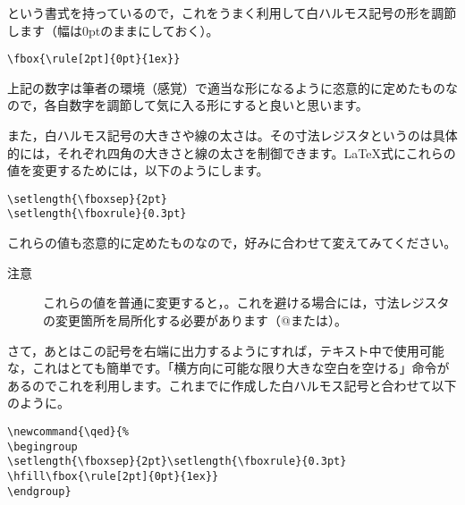 \documentclass[autodetect-engine,dvipdfmx]{jsarticle}
\begin{document}
という書式を持っているので，これをうまく利用して白ハルモス記号の形を調節します（幅は0ptのままにしておく）。

\begin{tcolorbox}

\begin{verbatim}
\fbox{\rule[2pt]{0pt}{1ex}}
\end{verbatim}

\end{tcolorbox}

上記の数字は筆者の環境（感覚）で適当な形になるように恣意的に定めたものなので，各自数字を調節して気に入る形にすると良いと思います。

また，白ハルモス記号の大きさや線の太さは\verb@{}。その寸法レジスタというのは具体的には\verb@{}\verb@{}，それぞれ四角の大きさと線の太さを制御できます。\LaTeX 式にこれらの値を変更するためには，以下のようにします。

\begin{tcolorbox}

\begin{verbatim}
\setlength{\fboxsep}{2pt}
\setlength{\fboxrule}{0.3pt}
\end{verbatim}

\end{tcolorbox}

これらの値も恣意的に定めたものなので，好みに合わせて変えてみてください。

\begin{description}
\item[注意]これらの値を普通に変更すると，\verb@{}\verb@{}。これを避ける場合には，寸法レジスタの変更箇所を局所化する必要があります（\verb@{}\verb@{}@または\verb@\begingroup{}）。
\end{description}

さて，あとはこの記号を右端に出力するようにすれば，テキスト中で使用可能な\verb@{}，これはとても簡単です。\verb@{}「横方向に可能な限り大きな空白を空ける」命令があるのでこれを利用します。これまでに作成した白ハルモス記号と合わせて以下のように\verb@{}。

\begin{tcolorbox}

\begin{verbatim}
\newcommand{\qed}{%
\begingroup
\setlength{\fboxsep}{2pt}\setlength{\fboxrule}{0.3pt}
\hfill\fbox{\rule[2pt]{0pt}{1ex}}
\endgroup}
\end{verbatim}

\end{tcolorbox}
\end{document}
